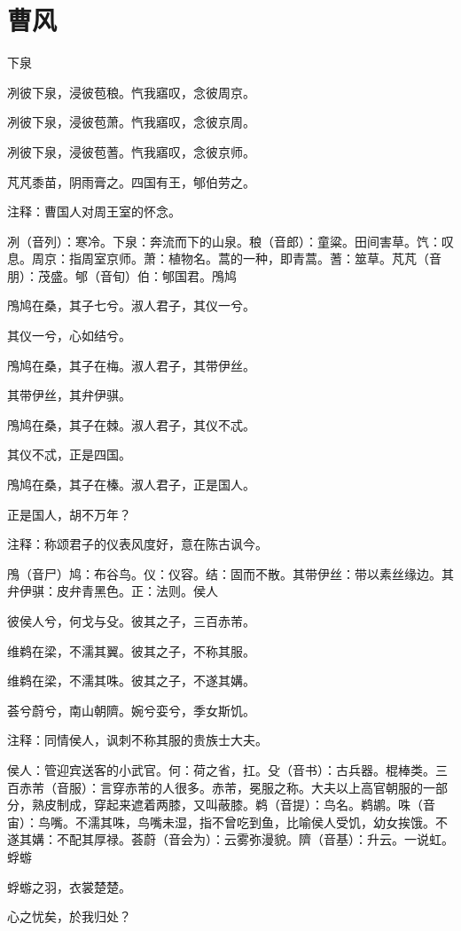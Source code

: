 \documentclass[12pt,UTF8]{ctexbook}
\begin{document}
\part{曹风}

下泉

冽彼下泉，浸彼苞稂。忾我寤叹，念彼周京。

冽彼下泉，浸彼苞萧。忾我寤叹，念彼京周。

冽彼下泉，浸彼苞蓍。忾我寤叹，念彼京师。

芃芃黍苗，阴雨膏之。四国有王，郇伯劳之。

注释：曹国人对周王室的怀念。

冽（音列）：寒冷。下泉：奔流而下的山泉。稂（音郎）：童粱。田间害草。饩：叹息。周京：指周室京师。萧：植物名。蒿的一种，即青蒿。蓍：筮草。芃芃（音朋）：茂盛。郇（音旬）伯：郇国君。鳲鸠

鳲鸠在桑，其子七兮。淑人君子，其仪一兮。

其仪一兮，心如结兮。

鳲鸠在桑，其子在梅。淑人君子，其带伊丝。

其带伊丝，其弁伊骐。

鳲鸠在桑，其子在棘。淑人君子，其仪不忒。

其仪不忒，正是四国。

鳲鸠在桑，其子在榛。淑人君子，正是国人。

正是国人，胡不万年？

注释：称颂君子的仪表风度好，意在陈古讽今。

鳲（音尸）鸠：布谷鸟。仪：仪容。结：固而不散。其带伊丝：带以素丝缘边。其弁伊骐：皮弁青黑色。正：法则。侯人

彼侯人兮，何戈与殳。彼其之子，三百赤芾。

维鹈在梁，不濡其翼。彼其之子，不称其服。

维鹈在梁，不濡其咮。彼其之子，不遂其媾。

荟兮蔚兮，南山朝隮。婉兮娈兮，季女斯饥。

注释：同情侯人，讽刺不称其服的贵族士大夫。

侯人：管迎宾送客的小武官。何：荷之省，扛。殳（音书）：古兵器。棍棒类。三百赤芾（音服）：言穿赤芾的人很多。赤芾，冕服之称。大夫以上高官朝服的一部分，熟皮制成，穿起来遮着两膝，又叫蔽膝。鹈（音提）：鸟名。鹈鹕。咮（音宙）：鸟嘴。不濡其咮，鸟嘴未湿，指不曾吃到鱼，比喻侯人受饥，幼女挨饿。不遂其媾：不配其厚禄。荟蔚（音会为）：云雾弥漫貌。隮（音基）：升云。一说虹。蜉蝣

蜉蝣之羽，衣裳楚楚。

心之忧矣，於我归处？
\end{document}
